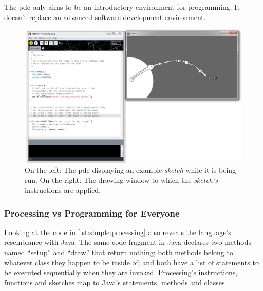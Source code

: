 \documentclass{./llncs2e/llncs}
\begin{document}
The \ac{pde} only aims to be an introductory environment for programming. It doesn't replace an advanced software development environment.

\begin{figure}
  \centering
  \includegraphics[width=1.0\textwidth]{img/proc_dev_env}
    \caption{On the left: The \ac{pde} displaying an example \emph{sketch} while it is being run. On the right: The drawing window to which the \emph{sketch's} instructions are applied.}
  \label{fig:proc:dev:env}
\end{figure} 

\subsubsection{Processing vs Programming for Everyone}
Looking at the code in \ref{lst:simple:processing} also reveals the language's resemblance with Java. The same code fragment in Java declares two methods named ``setup'' and ``draw'' that return nothing; both methods belong to whatever class they happen to be inside of; and both have a list of statements to be executed sequentially when they are invoked. Processing's instructions, functions and sketches map to Java's statements, methods and classes.

\end{document}
